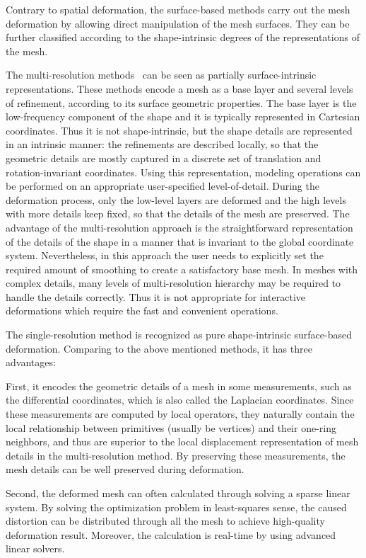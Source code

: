 Contrary to spatial deformation, the surface-based methods carry out the mesh deformation by allowing direct manipulation of the mesh surfaces. They can be further classified according to the shape-intrinsic degrees of the representations of the mesh.

The multi-resolution methods~\cite{ZSS97,GSS99,KCVS98,KVS99,SL99,BK04} can be seen as partially surface-intrinsic representations. These methods encode a mesh as a base layer and several levels of refinement, according to its surface geometric properties. The base layer is the low-frequency component of the shape and it is typically represented in Cartesian coordinates. Thus it is not shape-intrinsic, but the shape details are represented in an intrinsic manner: the refinements are described locally, so that the geometric details are mostly captured in a discrete set of translation and rotation-invariant coordinates. Using this representation, modeling operations can be performed on an appropriate user-specified level-of-detail. During the deformation process, only the low-level layers are deformed and the high levels with more details keep fixed, so that the details of the mesh are preserved. The advantage of the multi-resolution approach is the straightforward representation of the details of the shape in a manner that is invariant to the global coordinate system. Nevertheless, in this approach the user needs to explicitly set the required amount of smoothing to create a satisfactory base mesh. In meshes with complex details, many levels of multi-resolution hierarchy may be required to handle the details correctly. Thus it is not appropriate for interactive deformations which require the fast and convenient operations.

The single-resolution method is recognized as pure shape-intrinsic surface-based deformation. Comparing to the above mentioned methods, it has three advantages:

First, it encodes the geometric details of a mesh in some measurements, such as the differential coordinates, which is also called the Laplacian coordinates. Since these measurements are computed by local operators, they naturally contain the local relationship between primitives (usually be vertices) and their one-ring neighbors, and thus are superior to the local displacement representation of mesh details in the multi-resolution method. By preserving these measurements, the mesh details can be well preserved during deformation.

Second, the deformed mesh can often calculated through solving a sparse linear system. By solving the optimization problem in least-squares sense, the caused distortion can be distributed through all the mesh to achieve high-quality deformation result. Moreover, the calculation is real-time by using advanced linear solvers.

